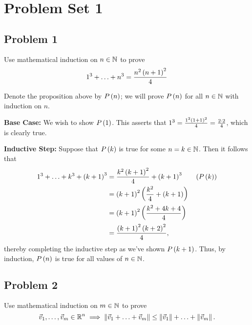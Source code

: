 \documentclass[main.tex]{subfiles}
\begin{document}
\section{Problem Set 1}

\subsection{Problem 1}
\begin{claim}
    Use mathematical induction on $n \in\mathbb N$ to prove
    \[1^3 + \ldots + n^3 = \frac{n^2\left( n + 1 \right)^2}{4}\] 
\end{claim}

\begin{soln}
    Denote the proposition above by $P\left( n \right)$; we will prove $P\left( n \right)$ for all $n\in \mathbb N$ with induction on $n$.

    \textbf{Base Case:} We wish to show $P\left( 1 \right)$. This asserts that $1^3 = \frac{1^2\left( 1 + 1 \right)^2}{4} = \frac{2\cdot 2}{4}$, which is clearly true.

    \textbf{Inductive Step:} Suppose that $P\left( k \right)$ is true for some $n = k\in \mathbb N$. Then it follows that
    \begin{align*}
        1^3 + \ldots + k^3 + \left( k + 1 \right)^3 &= \frac{k^2\left( k + 1 \right)^2}{4} + \left( k + 1 \right)^3 && \left( P\left( k \right) \right) \\
        &= \left( k + 1 \right)^2\left( \frac{k^2}{4} + \left( k + 1 \right) \right) \\
        &= \left( k + 1 \right)^2\left( \frac{k^2 + 4k + 4}{4} \right) \\
        &= \frac{\left( k + 1 \right)^2\left( k + 2 \right)^2}{4},
    \end{align*}
    thereby completing the inductive step as we've shown $P\left( k + 1 \right)$. Thus, by induction, $P\left( n \right)$ is true for all values of $n\in \mathbb N$.
\end{soln}
\eject

\subsection{Problem 2}
\begin{claim}
    Use mathematical induction on $m \in\mathbb N$ to prove
    \[\vec{v}_1,\ldots ,\vec{v}_m \in\mathbb R^n \implies \left\lVert \vec{v}_1 + \ldots  + \vec{v}_m \right\rVert  \le \left\lVert \vec{v}_1 \right\rVert + \ldots + \left\lVert \vec{v}_m \right\rVert.\]
\end{claim}
\end{document}
